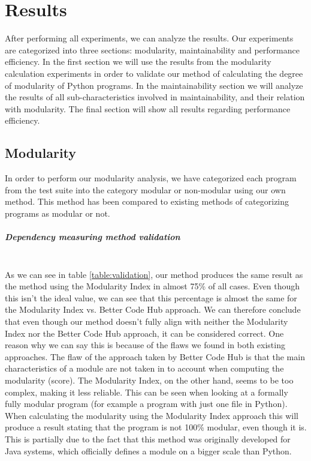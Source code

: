 \documentclass[twoside]{uva-inf-bachelor-thesis}
\newcommand{\myparagraph}[1]{\paragraph{#1}\mbox{}\\}
\begin{document}
\chapter{Results}
After performing all experiments, we can analyze the results. Our experiments are categorized into three sections: modularity, maintainability and performance efficiency. In the first section we will use the results from the modularity calculation experiments in order to validate our method of calculating the degree of modularity of Python programs. In the maintainability section we will analyze the results of all sub-characteristics involved in maintainability, and their relation with modularity. The final section will show all results regarding performance efficiency.

\section{Modularity}
In order to perform our modularity analysis, we have categorized each program from the test suite into the category modular or non-modular using our own method. This method has been compared to existing methods of categorizing programs as modular or not.

\myparagraph{Dependency measuring method validation}
As we can see in table \ref{table:validation}, our method produces the same result as the method using the Modularity Index in almost 75\% of all cases. Even though this isn't the ideal value, we can see that this percentage is almost the same for the Modularity Index vs. Better Code Hub approach. We can therefore conclude that even though our method doesn't fully align with neither the Modularity Index nor the Better Code Hub approach, it can be considered correct. One reason why we can say this is because of the flaws we found in both existing approaches. The flaw of the approach taken by Better Code Hub is that the main characteristics of a module are not taken in to account when computing the modularity (score). The Modularity Index, on the other hand, seems to be too complex, making it less reliable. This can be seen when looking at a formally fully modular program (for example a program with just one file in Python). When calculating the modularity using the Modularity Index approach this will produce a result stating that the program is not 100\% modular, even though it is. This is partially due to the fact that this method was originally developed for Java systems, which officially defines a module on a bigger scale than Python.
\end{document}
